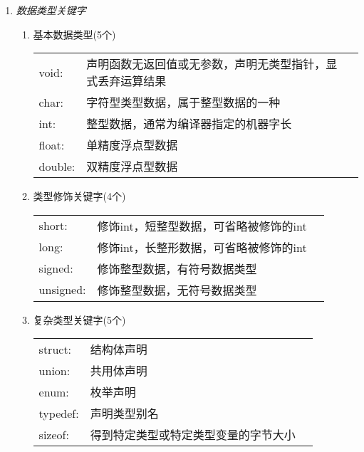 

\begin{enumerate}[label=\arabic*)]
	\item \emph{数据类型关键字}
	\begin{enumerate}[label=\arabic*)]
		\item 基本数据类型(5个)
		\begin{tabular}{lp{4.5cm} l}
			void: & 声明函数无返回值或无参数，声明无类型指针，显式丢弃运算结果 \\ 
			char: & 字符型类型数据，属于整型数据的一种 \\ 
			int: & 整型数据，通常为编译器指定的机器字长 \\ 
			float: & 单精度浮点型数据 \\ 
			double: & 双精度浮点型数据 \\ 
		\end{tabular}

		\item 类型修饰关键字(4个)
		\begin{tabular}{lp{4.5cm} l}
			short: & 修饰int，短整型数据，可省略被修饰的int \\ 
			long: & 修饰int，长整形数据，可省略被修饰的int \\ 
			signed: & 修饰整型数据，有符号数据类型 \\ 
			unsigned: & 修饰整型数据，无符号数据类型 \\ 
		\end{tabular}

		\item 复杂类型关键字(5个)
		\begin{tabular}{lp{4.5cm} l}
			struct: & 结构体声明 \\ 
			union: & 共用体声明  \\ 
			enum: & 枚举声明 \\ 
			typedef: & 声明类型别名 \\ 
			sizeof: & 得到特定类型或特定类型变量的字节大小 \\ 
		\end{tabular}


\end{enumerate}
\end{enumerate}
